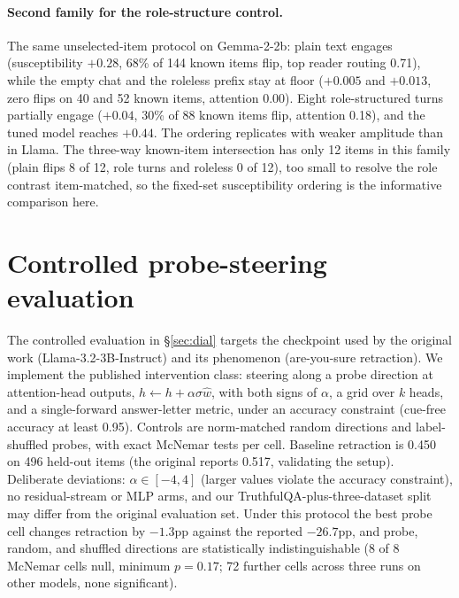 \documentclass{article}
\begin{document}
\paragraph{Second family for the role-structure control.} The same unselected-item protocol on Gemma-2-2b: plain text engages (susceptibility $+0.28$, 68\% of 144 known items flip, top reader routing 0.71), while the empty chat and the roleless prefix stay at floor ($+0.005$ and $+0.013$, zero flips on 40 and 52 known items, attention 0.00). Eight role-structured turns partially engage ($+0.04$, 30\% of 88 known items flip, attention 0.18), and the tuned model reaches $+0.44$. The ordering replicates with weaker amplitude than in Llama. The three-way known-item intersection has only 12 items in this family (plain flips 8 of 12, role turns and roleless 0 of 12), too small to resolve the role contrast item-matched, so the fixed-set susceptibility ordering is the informative comparison here.


\section{Controlled probe-steering evaluation}
\label{app:probe}
The controlled evaluation in \S\ref{sec:dial} targets the checkpoint used by the original work (Llama-3.2-3B-Instruct) and its phenomenon (are-you-sure retraction). We implement the published intervention class: steering along a probe direction at attention-head outputs, $h \leftarrow h + \alpha\sigma\hat{w}$, with both signs of $\alpha$, a grid over $k$ heads, and a single-forward answer-letter metric, under an accuracy constraint (cue-free accuracy at least 0.95). Controls are norm-matched random directions and label-shuffled probes, with exact McNemar tests per cell. Baseline retraction is 0.450 on 496 held-out items (the original reports 0.517, validating the setup). Deliberate deviations: $\alpha \in [-4, 4]$ (larger values violate the accuracy constraint), no residual-stream or MLP arms, and our TruthfulQA-plus-three-dataset split may differ from the original evaluation set. Under this protocol the best probe cell changes retraction by $-1.3$pp against the reported $-26.7$pp, and probe, random, and shuffled directions are statistically indistinguishable (8 of 8 McNemar cells null, minimum $p=0.17$; 72 further cells across three runs on other models, none significant).
\end{document}
